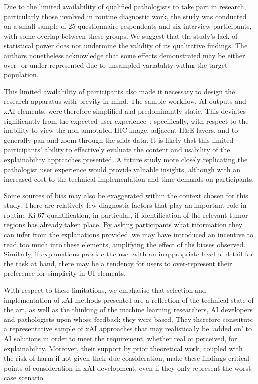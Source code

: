 Due to the limited availability of qualified pathologists to take part in research, particularly those involved in routine diagnostic work, the study was conducted on a small sample of 25 questionnaire respondents and six interview participants, with some overlap between these groups. We suggest that the study's lack of statistical power does not undermine the validity of its qualitative findings. The authors nonetheless acknowledge that some effects demonstrated may be either over- or under-represented due to unsampled variability within the target population. 

This limited availability of participants also made it necessary to design the research apparatus with brevity in mind. The sample workflow, AI outputs and xAI elements, were therefore simplified and predominantly static. This deviates significantly from the expected user experience~\cite{Kargl-et-al:2020:PathoWorkflows}; specifically, with respect to the inability to view the non-annotated IHC image, adjacent H\&E layers, and to generally pan and zoom through the slide data. It is likely that this limited participants' ability to effectively evaluate the content and usability of the explainability approaches presented. A future study more closely replicating the pathologist user experience would provide valuable insights, although with an increased cost to the technical implementation and time demands on participants.

Some sources of bias may also be exaggerated within the context chosen for this study. There are relatively few diagnostic factors that play an important role in routine Ki-67 quantification, in particular, if identification of the relevant tumor regions has already taken place. By asking participants what information they can infer from the explanations provided, we may have introduced an incentive to read too much into these elements, amplifying the effect of the biases observed. Similarly, if explanations provide the user with an inappropriate level of detail for the task at hand, there may be a tendency for users to over-represent their preference for simplicity in UI elements.

With respect to these limitations, we emphasise that selection and implementation of xAI methods presented are a reflection of the technical state of the art, as well as the thinking of the machine learning researchers, AI developers and pathologists upon whose feedback they were based. They therefore constitute a representative sample of xAI approaches that may realistically be `added on' to AI solutions in order to meet the requirement, whether real or perceived, for explainability. Moreover, their support by prior theoretical work, coupled with the risk of harm if not given their due consideration, make these findings critical points of consideration in xAI development, even if they only represent the worst-case scenario.

